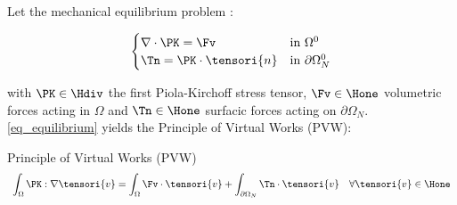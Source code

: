 Let the mechanical equilibrium problem :

      \begin{equation}
        \begin{cases}
          \nabla \cdot \PK = \Fv & \mbox{in } \Omega^0
          \\
          \Tn = \PK \cdot \tensori{n} & \mbox{in } \partial \Omega^0_N
        \end{cases}
        \label{eq_equilibrium}
      \end{equation}
      
      with $\PK \in \Hdiv$ the first Piola-Kirchoff stress tensor, $\Fv \in \Hone$ volumetric forces acting in $\Omega$ and $\Tn \in \Hone$ surfacic forces acting on $\partial \Omega_N$. \eqref{eq_equilibrium} yields the Principle of Virtual Works (PVW):

      \begin{theorembox}{Principle of Virtual Works (PVW)}
        \begin{equation}
          \begin{array}{lr}
            \displaystyle
            \int_{\Omega} \PK : \nabla \tensori{v} = \int_{\Omega} \Fv \cdot \tensori{v} + \int_{\partial \Omega_N} \Tn \cdot \tensori{v} &  \forall \tensori{v} \in \Hone
          \end{array}
        \end{equation}
        \label{eq_pvw}
      \end{theorembox}
